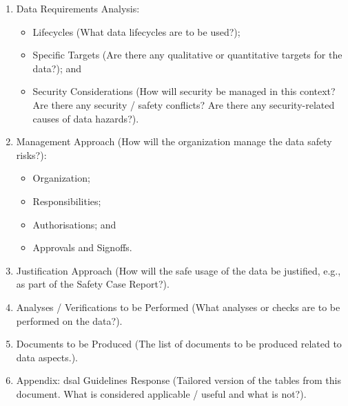 \begin{enumerate}
  \item Data Requirements Analysis:
  \begin{itemize}
    \item Lifecycles (What data lifecycles are to be used?);
    \item Specific Targets (Are there any qualitative or quantitative targets for the data?); and
    \item Security Considerations (How will security be managed in this context? Are there any security / safety conflicts? Are there any security-related causes of data hazards?).
  \end{itemize}
  \item Management Approach (How will the organization manage the data safety risks?):
  \begin{itemize}
    \item Organization;
    \item Responsibilities;
    \item Authorisations; and
    \item Approvals and Signoffs.
  \end{itemize}
  \item Justification Approach (How will the safe usage of the data be justified, e.g., as part of the Safety Case Report?). 
  \item Analyses / Verifications to be Performed (What analyses or checks are to be performed on the data?).
  \item Documents to be Produced (The list of documents to be produced related to data aspects.).
  \item Appendix: \gls{dsal} Guidelines Response (Tailored version of the tables from this document. What is considered applicable / useful and what is not?).
\end{enumerate}
